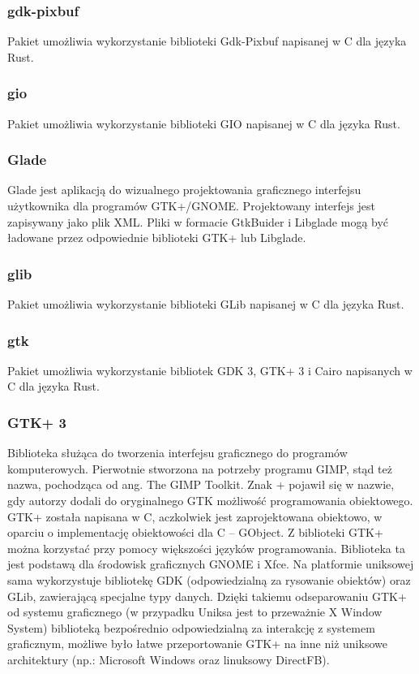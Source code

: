 \documentclass[12pt,a4paper]{article}
\begin{document}
				\subsubsection{gdk-pixbuf}

					\indent Pakiet umożliwia wykorzystanie biblioteki Gdk-Pixbuf napisanej w C dla języka Rust.
				\subsubsection{gio}

					\indent Pakiet umożliwia wykorzystanie biblioteki GIO napisanej w C dla języka Rust.
				\subsubsection{Glade}

					\indent Glade jest aplikacją do wizualnego projektowania graficznego interfejsu użytkownika dla programów GTK+/GNOME.
					Projektowany interfejs jest zapisywany jako plik XML. Pliki w formacie GtkBuider i Libglade mogą być ładowane przez odpowiednie biblioteki GTK+ lub Libglade. 
				\subsubsection{glib}

					\indent  Pakiet umożliwia wykorzystanie biblioteki GLib napisanej w C dla języka Rust.
				\subsubsection{gtk}

					\indent Pakiet umożliwia wykorzystanie bibliotek GDK 3, GTK+ 3 i Cairo napisanych w C dla języka Rust.
				\subsubsection{GTK+ 3}

					\indent  Biblioteka służąca do tworzenia interfejsu graficznego do programów komputerowych. Pierwotnie stworzona na potrzeby programu GIMP,
					stąd też nazwa, pochodząca od ang. The GIMP Toolkit. Znak + pojawił się w nazwie, gdy autorzy dodali do oryginalnego GTK możliwość programowania obiektowego.
					GTK+ została napisana w C, aczkolwiek jest zaprojektowana obiektowo, w oparciu o implementację obiektowości dla C – GObject. Z biblioteki GTK+ można korzystać
					przy pomocy większości języków programowania. Biblioteka ta jest podstawą dla środowisk graficznych GNOME i Xfce. Na platformie uniksowej sama wykorzystuje
					bibliotekę GDK (odpowiedzialną za rysowanie obiektów) oraz GLib, zawierającą specjalne typy danych. Dzięki takiemu odseparowaniu GTK+ od systemu graficznego
					(w przypadku Uniksa jest to przeważnie X Window System) biblioteką bezpośrednio odpowiedzialną za interakcję z systemem graficznym, możliwe było łatwe
					przeportowanie GTK+ na inne niż uniksowe architektury (np.: Microsoft Windows oraz linuksowy DirectFB).
\end{document}
